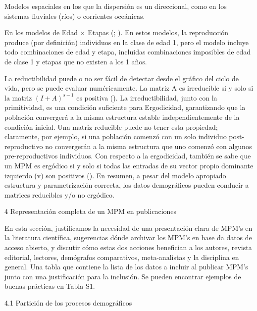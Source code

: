 \documentclass[
]{book}
\theoremstyle{definition}
\theoremstyle{definition}
\theoremstyle{definition}
\theoremstyle{definition}
\theoremstyle{remark}
\begin{document}
Modelos espaciales en los que la dispersión es un direccional, como en los sistemas fluviales (ríos) o corrientes oceánicas.

En los modelos de Edad × Etapas (\citet{caswell2009stage}; \citet{caswell2013age}). En estos modelos, la reproducción produce (por definición) individuos en la clase de edad 1, pero el modelo incluye todo combinaciones de edad y etapa, incluidas combinaciones imposibles de edad de clase 1 y etapas que no existen a los 1 años.

La reductibilidad puede o no ser fácil de detectar desde el gráfico del ciclo de vida, pero se puede evaluar numéricamente. La matriz A es irreducible si y solo si la matriz \(\left(I+A\right)^{s-1}\) es positiva (\citet{caswell2001matrix}). La irreductibilidad, junto con la primitividad, es una condición suficiente para Ergodicidad, garantizando que la población convergerá a la misma estructura estable independientemente de la condición inicial. Una matriz reducible puede no tener esta propiedad; claramente, por ejemplo, si una población comenzó con un solo individuo post-reproductivo no convergerán a la misma estructura que uno comenzó con algunos pre-reproductivos individuos. Con respecto a la ergodicidad, también se sabe que un MPM es ergódico si y solo si todas las entradas de su vector propio dominante izquierdo (v) son positivos (\citet{stott2010reducibility}). En resumen, a pesar del modelo apropiado estructura y parametrización correcta, los datos demográficos pueden conducir a matrices reducibles y/o no ergódico.

4 \textbar{} Representación completa de un MPM en publicaciones

En esta sección, justificamos la necesidad de una presentación clara de MPM's en la literatura científica, sugerencias dónde archivar los MPM's en base da datos de acceso abierto, y discutir cómo estas dos acciones benefician a los autores, revista editorial, lectores, demógrafos comparativos, meta-analistas y la disciplina en general. Una tabla que contiene la lista de los datos a incluir al publicar MPM's junto con una justificación para la inclusión. Se pueden encontrar ejemplos de buenas prácticas en Tabla S1.

4.1 \textbar{} Partición de los procesos demográficos
\end{document}
